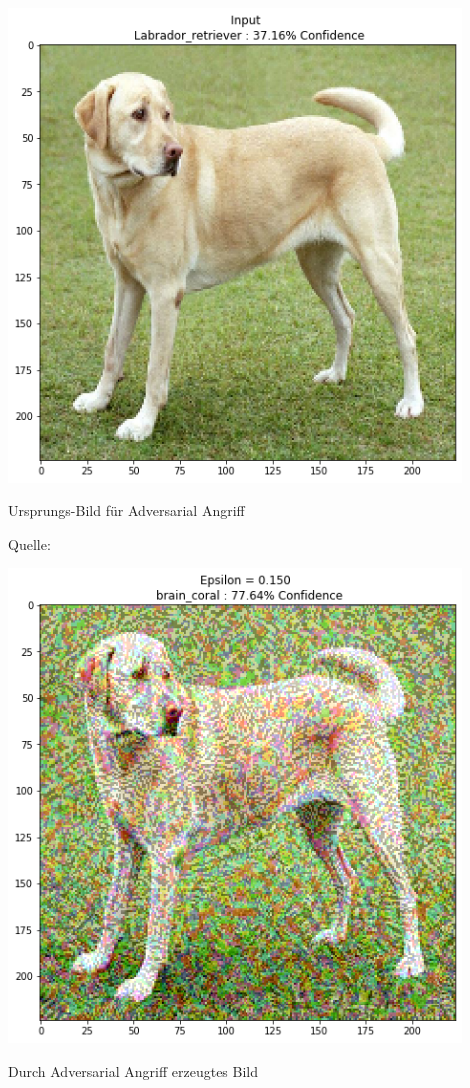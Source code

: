 \documentclass[
  12pt, %
  a4paper, %
  oneside, %
  openany, 
  numbers=noenddot, %
  BCOR=5mm, %
  parskip=half*, %
  thesis, %
]{bfhbook}
\begin{document}
\begin{center}
\begin{minipage}[t]{0.45\linewidth}
	\vspace{0pt}
	\centering
	\includegraphics[width=0.9\textwidth]{Bilder/tensorflow-adversarial-original.png}
	 \caption{Ursprungs-Bild für Adversarial Angriff}
	\caption*{Quelle: \parencite{tensorflowFGSM}}
\end{minipage}\hfill
\begin{minipage}[t]{0.45\linewidth}
	\vspace{0pt}
	\centering
	\includegraphics[width=0.9\textwidth]{Bilder/tensorflow-adversarial-fake.png}
	 \caption{Durch Adversarial Angriff erzeugtes Bild}
\end{minipage}
\end{center}
\end{document}
